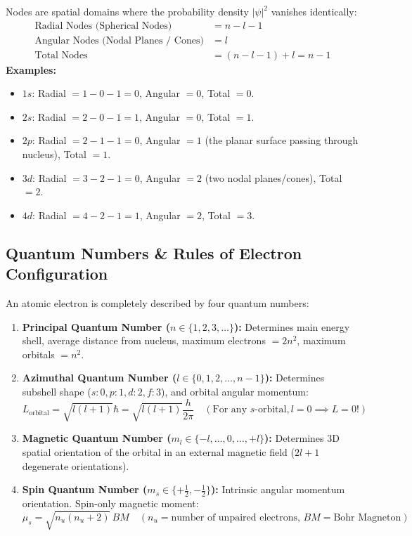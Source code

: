\documentclass[10pt,a4paper]{article}
\begin{document}
\begin{formulabox}
Nodes are spatial domains where the probability density $|\psi|^2$ vanishes identically:
\begin{align}
  \text{Radial Nodes (Spherical Nodes)} &= n - l - 1 \\
  \text{Angular Nodes (Nodal Planes / Cones)} &= l \\
  \text{Total Nodes} &= (n - l - 1) + l = n - 1
\end{align}
\textbf{Examples:}
\begin{itemize}
  \item $1s$: Radial $= 1 - 0 - 1 = 0$, Angular $= 0$, Total $= 0$.
  \item $2s$: Radial $= 2 - 0 - 1 = 1$, Angular $= 0$, Total $= 1$.
  \item $2p$: Radial $= 2 - 1 - 1 = 0$, Angular $= 1$ (the planar surface passing through nucleus), Total $= 1$.
  \item $3d$: Radial $= 3 - 2 - 1 = 0$, Angular $= 2$ (two nodal planes/cones), Total $= 2$.
  \item $4d$: Radial $= 4 - 2 - 1 = 1$, Angular $= 2$, Total $= 3$.
\end{itemize}
\end{formulabox}

\subsection{Quantum Numbers \& Rules of Electron Configuration}
An atomic electron is completely described by four quantum numbers:
\begin{enumerate}
  \item \textbf{Principal Quantum Number ($n \in \{1, 2, 3, \dots\}$):} Determines main energy shell, average distance from nucleus, maximum electrons $= 2n^2$, maximum orbitals $= n^2$.
  \item \textbf{Azimuthal Quantum Number ($l \in \{0, 1, 2, \dots, n-1\}$):} Determines subshell shape ($s: 0, p: 1, d: 2, f: 3$), and orbital angular momentum:
  \begin{equation}
    L_{\text{orbital}} = \sqrt{l(l+1)}\hbar = \sqrt{l(l+1)}\frac{h}{2\pi} \quad (\text{For any } s\text{-orbital}, l=0 \implies L=0!)
  \end{equation}
  \item \textbf{Magnetic Quantum Number ($m_l \in \{-l, \dots, 0, \dots, +l\}$):} Determines 3D spatial orientation of the orbital in an external magnetic field ($2l+1$ degenerate orientations).
  \item \textbf{Spin Quantum Number ($m_s \in \{+\frac{1}{2}, -\frac{1}{2}\}$):} Intrinsic angular momentum orientation. Spin-only magnetic moment:
  \begin{equation}
    \mu_s = \sqrt{n_u(n_u + 2)}\,\si{BM} \quad (n_u = \text{number of unpaired electrons, } \si{BM} = \text{Bohr Magneton})
  \end{equation}
\end{enumerate}
\end{document}
